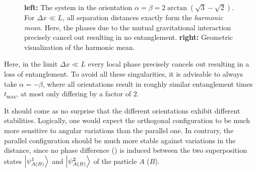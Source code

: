 \begin{figure}[!htbp]
  \centering
  \def\svgwidth{\textwidth}
  
  \caption{\textbf{left:} The system in the orientation $\alpha=\beta=2\arctan(\sqrt{3}-\sqrt{2})$. For $\Delta x \ll L$, all separation distances exactly form the \textit{harmonic mean}. Here, the phases due to the mutual gravitational interaction precisely cancel out resulting in no entanglement. \textbf{right:} Geometric visualization of the harmonic mean.}
  \label{fig:4:harmonic-mean}
\end{figure}
Here, in the limit $\Delta x \ll L$ every local phase precisely cancels out resulting in a loss of entanglement. 
To avoid all these singularities, it is advisable to always take $\alpha=-\beta$, where all orientations result in roughly similar entanglement times $t_\mathrm{max}$, at most only differing by a factor of $2$.

It should come as no surprise that the different orientations exhibit different stabilities. Logically, one would expect the orthogonal configuration to be much more sensitive to angular variations than the parallel one.
In contrary, the parallel configuration should be much more stable against variations in the distance, since no phase difference () is induced between the two superposition states $\ket{\psi^1_{A(B)}}$ and $\ket{\psi^2_{A(B)}}$ of the particle $A$ ($B$).

